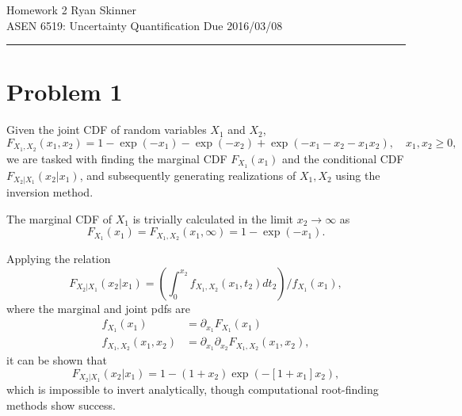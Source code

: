 \documentclass[11pt]{article}
\begin{document}
\newcommand{\widesim}[2][1.5]{
  \mathrel{\overset{#2}{\scalebox{#1}[1]{$\sim$}}}
}

\pagestyle{fancyplain}
\lhead{}
\chead{}
\rhead{}
\cfoot{\hrule \thepage}

\noindent
{\Large Homework 2}
\hfill
{\large Ryan Skinner}
\\[0.5ex]
{\large ASEN 6519: Uncertainty Quantification}
\hfill
{\large Due 2016/03/08}\\
\hrule
\vspace{6pt}

\section*{Problem 1} %

Given the joint CDF of random variables $X_1$ and $X_2$,
\begin{equation}
F_{X_1,X_2}(x_1,x_2) = 1 - \exp(-x_1) - \exp(-x_2) + \exp(-x_1-x_2-x_1x_2)
, \quad x_1,x_2 \ge 0,
\end{equation}
we are tasked with finding the marginal CDF $F_{X_1}(x_1)$ and the conditional CDF $F_{X_2|X_1}(x_2|x_1)$, and subsequently generating realizations of $X_1,X_2$ using the inversion method.

The marginal CDF of $X_1$ is trivially calculated in the limit $x_2 \rightarrow \infty$ as
\begin{equation}
\boxed{F_{X_1}(x_1)} = F_{X_1,X_2}(x_1,\infty) = 1 - \exp(-x_1)
.
\end{equation}

Applying the relation
\begin{equation}
F_{X_2|X_1}(x_2|x_1) = \left( \int_0^{x_2} f_{X_1,X_2}(x_1,t_2) dt_2 \right) \Big/ f_{X_1}(x_1)
,
\end{equation}
where the marginal and joint pdfs are
\begin{align*}
f_{X_1}(x_1) &= \partial_{x_1} F_{X_1}(x_1) \\
f_{X_1,X_2}(x_1,x_2) &= \partial_{x_1} \partial_{x_2} F_{X_1,X_2}(x_1,x_2)
,
\end{align*}
it can be shown that
\begin{equation}
\boxed{F_{X_2|X_1}(x_2|x_1)} = 1 - (1+x_2) \exp(-[1+x_1]x_2)
,
\end{equation}
which is impossible to invert analytically, though computational root-finding methods show success.
\end{document}
